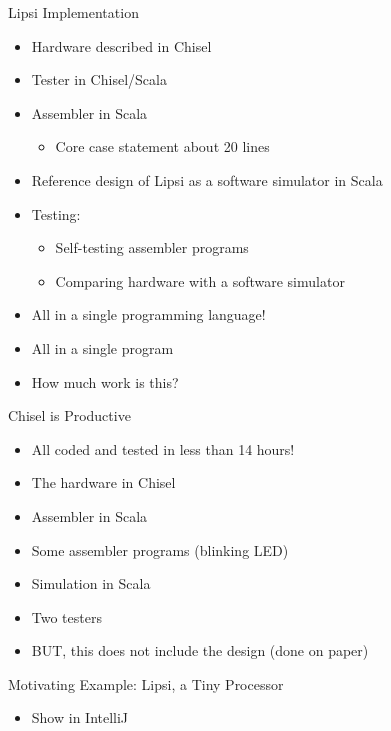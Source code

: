 \begin{frame}[fragile]{Lipsi Implementation}
\begin{itemize}
\item Hardware described in Chisel
\item Tester in Chisel/Scala
\item Assembler in Scala
\begin{itemize}
\item Core case statement about 20 lines
\end{itemize}
\item Reference design of Lipsi as a software simulator in Scala
\item Testing:
\begin{itemize}
\item Self-testing assembler programs
\item Comparing hardware with a software simulator
\end{itemize}
\item All in a single programming language!
\item All in a single program
\item How much work is this?
\end{itemize}
\end{frame}

\begin{frame}[fragile]{Chisel is Productive}
\begin{itemize}
\item All coded and tested in less than 14 hours!
\end{itemize}
\begin{itemize}
\item The hardware in Chisel
\item Assembler in Scala
\item Some assembler programs (blinking LED)
\item Simulation in Scala
\item Two testers
\end{itemize}
\begin{itemize}
\item BUT, this does not include the design (done on paper)
\end{itemize}
\end{frame}

\begin{frame}[fragile]{Motivating Example: Lipsi, a Tiny Processor}
\begin{itemize}
\item Show in IntelliJ
\end{itemize}
\end{frame}

